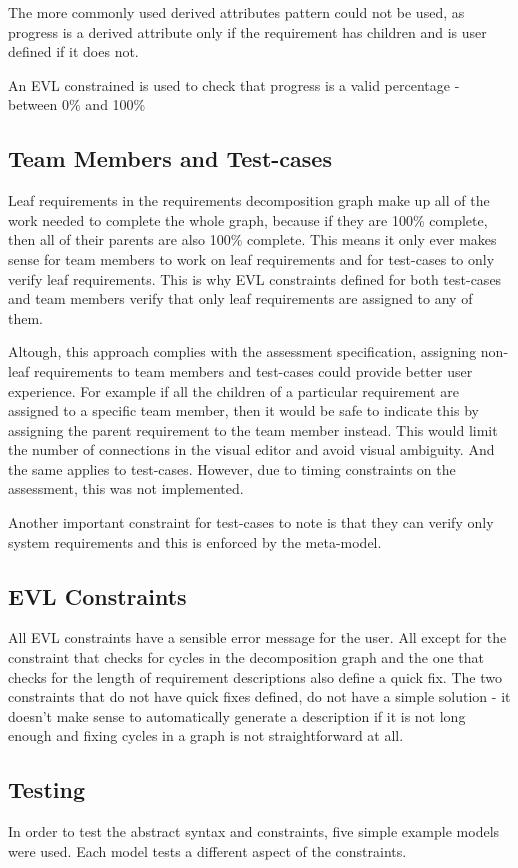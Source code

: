 \documentclass[11pt,a4paper]{article}
\begin{document}
	The more commonly used derived attributes pattern could not be used, as progress is a derived attribute only if the requirement has children and is user defined if it does not. 
	
	An EVL constrained is used to check that progress is a valid percentage - between 0\% and 100\%
	
	\subsection{Team Members and Test-cases}
	Leaf requirements in the requirements decomposition graph make up all of the work needed to complete the whole graph, because if they are 100\% complete, then all of their parents are also 100\% complete. This means it only ever makes sense for team members to work on leaf requirements and for test-cases to only verify leaf requirements. This is why EVL constraints defined for both test-cases and team members verify that only leaf requirements are assigned to any of them. 
	
	Altough, this approach complies with the assessment specification, assigning non-leaf requirements to team members and test-cases could provide better user experience. For example if all the children of a particular requirement are assigned to a specific team member, then it would be safe to indicate this by assigning the parent requirement to the team member instead. This would limit the number of connections in the visual editor and avoid visual ambiguity. And the same applies to test-cases. However, due to timing constraints on the assessment, this was not implemented.
	
	Another important constraint for test-cases to note is that they can verify only system requirements and this is enforced by the meta-model.
	
	\subsection{EVL Constraints}
	All EVL constraints have a sensible error message for the user. All except for the constraint that checks for cycles in the decomposition graph and the one that checks for the length of requirement descriptions also define a quick fix. The two constraints that do not have quick fixes defined, do not have a simple solution - it doesn't make sense to automatically generate a description if it is not long enough and fixing cycles in a graph is not straightforward at all. 
	
	\subsection{Testing}
	In order to test the abstract syntax and constraints, five simple example models were used. Each model tests a different aspect of the constraints.
	
\end{document}
